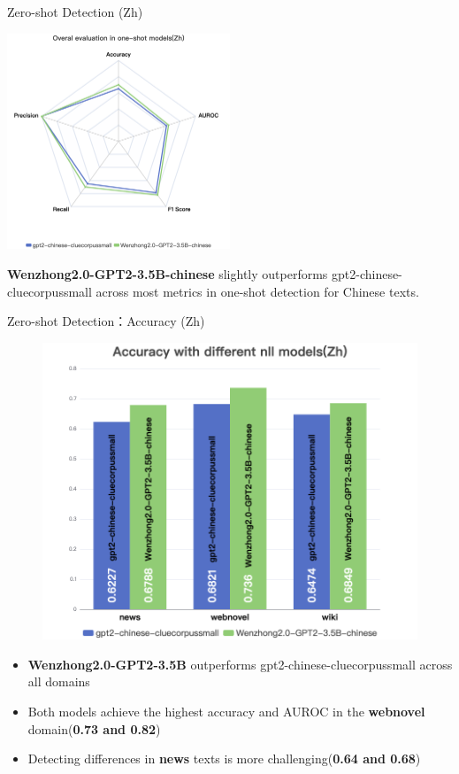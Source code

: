 \documentclass[serif]{beamer}
\begin{document}
\begin{frame}{Zero-shot Detection (Zh)}

\centering
\includegraphics[width=0.5\textwidth]{images/Overal evaluation in one-shot models(Zh).png}

\vspace{-0.2em}
\begin{flushleft}
\scriptsize
\textbf{Wenzhong2.0-GPT2-3.5B-chinese} slightly outperforms gpt2-chinese-cluecorpussmall across most metrics in one-shot detection for Chinese texts.
\normalize
\end{flushleft}

\end{frame}
\begin{frame}{Zero-shot Detection：Accuracy (Zh)}
    \begin{figure}
        \centering
        \includegraphics[width=0.5\linewidth]{images/Accuracy with different nll models(Zh).png}
        \label{fig:enter-label}
    \end{figure}
    \begin{itemize}
    \item \textbf{Wenzhong2.0-GPT2-3.5B} outperforms gpt2-chinese-cluecorpussmall across all domains
    \item Both models achieve the highest accuracy and AUROC in the \textbf{webnovel} domain(\textbf{0.73 and 0.82})
    \item Detecting differences in \textbf{news} texts is more challenging(\textbf{0.64 and 0.68})
\end{itemize}
\end{frame}
\end{document}
